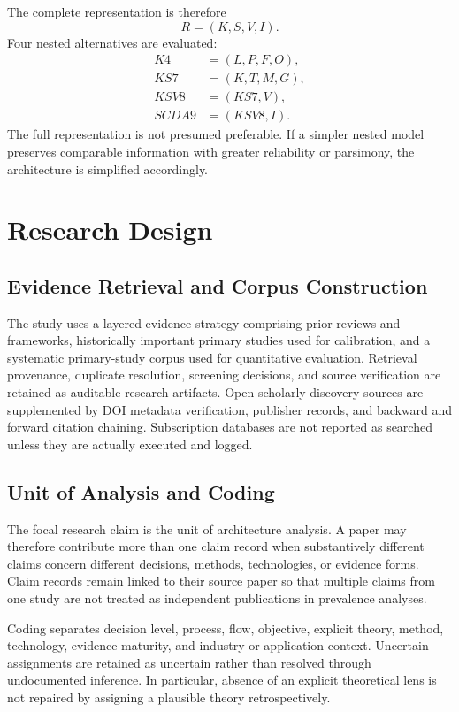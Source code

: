 \documentclass[journal]{IEEEtran}
\begin{document}
The complete representation is therefore
\begin{equation}
R=(K,S,V,I).
\end{equation}
Four nested alternatives are evaluated:
\begin{align}
K4 &= (L,P,F,O),\\
KS7 &= (K,T,M,G),\\
KSV8 &= (KS7,V),\\
SCDA9 &= (KSV8,I).
\end{align}
The full representation is not presumed preferable. If a simpler nested model preserves comparable information with greater reliability or parsimony, the architecture is simplified accordingly.

\section{Research Design}
\subsection{Evidence Retrieval and Corpus Construction}
The study uses a layered evidence strategy comprising prior reviews and frameworks, historically important primary studies used for calibration, and a systematic primary-study corpus used for quantitative evaluation. Retrieval provenance, duplicate resolution, screening decisions, and source verification are retained as auditable research artifacts. Open scholarly discovery sources are supplemented by DOI metadata verification, publisher records, and backward and forward citation chaining. Subscription databases are not reported as searched unless they are actually executed and logged.

\subsection{Unit of Analysis and Coding}
The focal research claim is the unit of architecture analysis. A paper may therefore contribute more than one claim record when substantively different claims concern different decisions, methods, technologies, or evidence forms. Claim records remain linked to their source paper so that multiple claims from one study are not treated as independent publications in prevalence analyses.

Coding separates decision level, process, flow, objective, explicit theory, method, technology, evidence maturity, and industry or application context. Uncertain assignments are retained as uncertain rather than resolved through undocumented inference. In particular, absence of an explicit theoretical lens is not repaired by assigning a plausible theory retrospectively.
\end{document}
